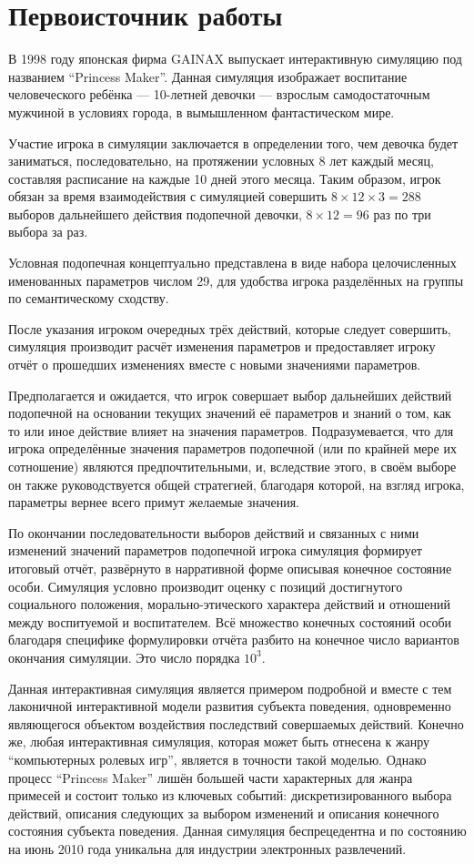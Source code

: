 \chapter{Первоисточник работы}
В 1998 году японская фирма GAINAX выпускает интерактивную симуляцию под названием ``Princess Maker''. Данная симуляция изображает воспитание человеческого ребёнка --- 10-летней девочки --- взрослым самодостаточным мужчиной в условиях города, в вымышленном фантастическом мире. 

Участие игрока в симуляции заключается в определении того, чем девочка будет заниматься, последовательно, на протяжении условных 8 лет каждый месяц, составляя расписание на каждые 10 дней этого месяца. Таким образом, игрок обязан за время взаимодействия с симуляцией совершить $8\times12\times 3=288$ выборов дальнейшего действия подопечной девочки, $8\times 12=96$ раз по три выбора за раз.

Условная подопечная концептуально представлена в виде набора целочисленных именованных параметров числом 29, для удобства игрока разделённых на группы по семантическому сходству.

После указания игроком очередных трёх действий, которые следует совершить, симуляция производит расчёт изменения параметров и предоставляет игроку отчёт о прошедших изменениях вместе с новыми значениями параметров.

Предполагается и ожидается, что игрок совершает выбор дальнейших действий подопечной на основании текущих значений её параметров и знаний о том, как то или иное действие влияет на значения параметров. Подразумевается, что для игрока определённые значения параметров подопечной (или по крайней мере их сотношение) являются предпочтительными, и, вследствие этого, в своём выборе он также руководствуется общей стратегией, благодаря которой, на взгляд игрока, параметры вернее всего примут желаемые значения.

По окончании последовательности выборов действий и связанных с ними изменений значений параметров подопечной игрока симуляция формирует итоговый отчёт, развёрнуто в нарративной форме описывая конечное состояние особи. Симуляция условно производит оценку с позиций достигнутого социального положения, морально-этического характера действий и отношений между воспитуемой и воспитателем. Всё множество конечных состояний особи благодаря специфике формулировки отчёта разбито на конечное число вариантов окончания симуляции. Это число порядка $10^3$.

Данная интерактивная симуляция является примером подробной и вместе с тем лаконичной интерактивной модели развития субъекта поведения, одновременно являющегося объектом воздействия последствий совершаемых действий. Конечно же, любая интерактивная симуляция, которая может быть отнесена к жанру ``компьютерных ролевых игр'', является в точности такой моделью. Однако процесс ``Princess Maker'' лишён большей части характерных для жанра примесей и состоит только из ключевых событий: дискретизированного выбора действий, описания следующих за выбором изменений и описания конечного состояния субъекта поведения. Данная симуляция беспрецедентна и по состоянию на июнь 2010 года уникальна для индустрии электронных развлечений.

